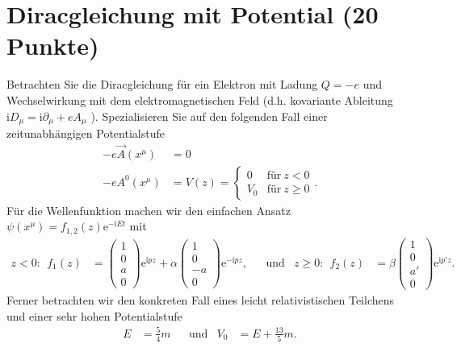 \documentclass[german, parskip=full]{scrartcl}
\newcommand{\tecxt}{}
\newcommand{\I}{\text{i}}
\newcommand{\e}{\text{e}}
\begin{document}
\section{Diracgleichung mit Potential (20 Punkte)}
Betrachten Sie die Diracgleichung für ein Elektron mit Ladung $Q=-e$ und Wechselwirkung mit dem elektromagnetischen Feld (d.h. kovariante Ableitung $\I D_\mu =\I\partial_\mu +eA_\mu$ ).
Spezialisieren Sie auf den folgenden Fall einer zeitunabhängigen Potentialstufe 
\begin{align}
-e\vec{A}(x^\mu)&=0\\
-e A^0(x^\mu)&=V(z)=\begin{cases}0&\tecxt\text{für}\ z<0 \\ V_0&\tecxt\text{für}\ z\ge 0\end{cases}.
\end{align}
Für die Wellenfunktion machen wir den einfachen Ansatz $\psi (x^\mu)=f_{1,2}(z)\e^{-\I Et}$ mit
\begin{align}
z<0:\ \ f_1(z)&=\begin{pmatrix}
1\\ 0\\ a\\ 0
\end{pmatrix}\e^{\I pz}+\alpha\begin{pmatrix}
1\\ 0\\ -a\\ 0
\end{pmatrix}\e^{-\I pz},&&\tecxt\text{und}&z\ge 0:\ \ f_2(z)&=\beta\begin{pmatrix}
1\\ 0\\ a'\\ 0
\end{pmatrix}\e^{\I p'z}.\label{eqn:AnsatzPotentialstufe}
\end{align}
Ferner betrachten wir den konkreten Fall eines leicht relativistischen Teilchens und einer sehr
hohen Potentialstufe
\begin{align}
E&=\frac{5}{4}m&&\tecxt\text{und}&V_0&=E+\frac{13}{5}m.\label{eqn:KonkreteEnergieWerte}
\end{align}
\end{document}
